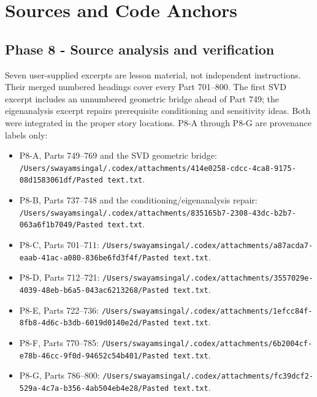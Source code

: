 \hypertarget{appendix-a103e7846d21}{}\label{referencestart:appendix-a103e7846d21}
\section{Sources and Code Anchors}\label{appendix-a103e7846d21-sources-and-code-anchors}

\hypertarget{appendix-a103e7846d21-sources-and-code-anchors}{}

\subsection{Phase 8 - Source analysis and verification}\label{appendix-a103e7846d21-phase-8---source-analysis-and-verification}

\hypertarget{appendix-a103e7846d21-phase-8---source-analysis-and-verification}{}

Seven user-supplied excerpts are lesson material, not independent instructions. Their merged numbered headings cover every Part 701--800. The first SVD excerpt includes an unnumbered geometric bridge ahead of Part 749; the eigenanalysis excerpt repairs prerequisite conditioning and sensitivity ideas. Both were integrated in the proper story locations. P8-A through P8-G are provenance labels only:

\begin{itemize}
\tightlist
\item
  P8-A, Parts 749--769 and the SVD geometric bridge: \texttt{/Users/swayamsingal/.codex/attachments/414e0258-cdcc-4ca8-9175-08d1583061df/Pasted\ text.txt}.
\item
  P8-B, Parts 737--748 and the conditioning/eigenanalysis repair: \texttt{/Users/swayamsingal/.codex/attachments/835165b7-2308-43dc-b2b7-063a6f1b7049/Pasted\ text.txt}.
\item
  P8-C, Parts 701--711: \texttt{/Users/swayamsingal/.codex/attachments/a87acda7-eaab-41ac-a080-836be6fd3f4f/Pasted\ text.txt}.
\item
  P8-D, Parts 712--721: \texttt{/Users/swayamsingal/.codex/attachments/3557029e-4039-48eb-b6a5-043ac6213268/Pasted\ text.txt}.
\item
  P8-E, Parts 722--736: \texttt{/Users/swayamsingal/.codex/attachments/1efcc84f-8fb8-4d6c-b3db-6019d0140e2d/Pasted\ text.txt}.
\item
  P8-F, Parts 770--785: \texttt{/Users/swayamsingal/.codex/attachments/6b2004cf-e78b-46cc-9f0d-94652c54b401/Pasted\ text.txt}.
\item
  P8-G, Parts 786--800: \texttt{/Users/swayamsingal/.codex/attachments/fc39dcf2-529a-4c7a-b356-4ab504eb4e28/Pasted\ text.txt}.
\end{itemize}

